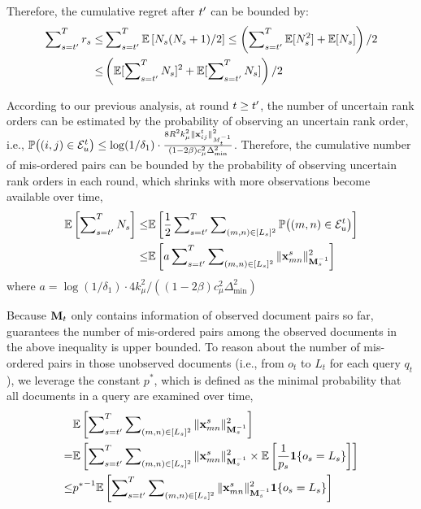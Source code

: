 Therefore, the cumulative regret after $t^\prime$ can be bounded by:
\small
 \begin{align*}
     \sum\nolimits_{s=t^\prime}^T r_s \leq & \sum\nolimits_{s=t^\prime}^T\mathbb{E}\left[{N_s(N_s+1)}/{2}\right] \nonumber \leq  \left(\sum\nolimits_{s=t^\prime}^T\mathbb{E}[N_s^2] + \mathbb{E}[N_s]\right)/2 \nonumber \\
    \leq &  \left(\mathbb{E}[\sum\nolimits_{s=t^\prime}^TN_s]^2 +\mathbb{E}[\sum\nolimits_{s=t^\prime}^TN_s]\right)/2
 \end{align*}
 \normalsize

According to our previous analysis, at round $t \geq t^\prime$, the number of uncertain rank orders can be estimated by the probability of observing an uncertain rank order, i.e., $\mathbb{P}\big((i, j) \in \mathcal{E}_u^t\big) \leq \log({1}/{\delta_1}) \cdot \frac{8R^2k_{\mu}^2\Vert{\mathbf{x}_{ij}^t}\Vert_{M_t^{-1}}^2}{(1 - 2\beta)c_{\mu}^2\Delta_{\min}^2}$. Therefore, the cumulative number of mis-ordered pairs can be bounded by the probability of observing uncertain rank orders in each round, which shrinks with more observations become available over time, 
\small
\begin{align*}
\label{eqn:up}
    \mathbb{E}\left[\sum\nolimits_{s=t^\prime}^T N_s\right] \leq &  \mathbb{E}\left[\frac{1}{2}\sum\nolimits_{s=t^\prime}^T \sum\nolimits_{(m, n) \in [L_s]^2} \mathbb{P}\big((m, n) \in \mathcal{E}_u^t\big)\right] \\
    \leq & \mathbb{E}\left[a\sum\nolimits_{s=t^\prime}^T\sum\nolimits_{(m, n) \in [L_s]^2} \Vert{\mathbf{x}_{mn}^s}\Vert_{\mathbf{M}_s^{-1}}^2\right]
\end{align*}
\normalsize
where $a = \log({1}/{\delta_1})\cdot{4k_{\mu}^2}/({(1 - 2\beta)c_{\mu}^2\Delta_{\min}^2})$

Because $\mathbf{M}_t$ only contains information of observed document pairs so far, \model{} guarantees the number of mis-ordered pairs among the observed documents in the above inequality is upper bounded. 
To reason about the number of mis-ordered pairs in those unobserved documents (i.e., from $o_t$ to $L_t$ for each query $q_t$), we leverage the constant $p^*$, which is defined as the minimal probability that all documents in a query are examined over time, 
\small
\begin{align*}
    &\mathbb{E}\left[\sum\nolimits_{s=t^\prime}^T\sum\nolimits_{(m, n) \in [L_s]^2} \Vert{\mathbf{x}_{mn}^s}\Vert_{\mathbf{M}_s^{-1}}^2\right] \\
    =& \mathbb{E}\left[\sum\nolimits_{s=t^\prime}^T\sum\nolimits_{(m, n) \in [L_s]^2} \Vert{\mathbf{x}_{mn}^s}\Vert_{\mathbf{M}_s^{-1}}^2\times \mathbb{E}\left[\frac{1}{p_{s}}\mathbf{1}\{o_s = L_s\}\right]\right] \\
    \leq& 
    {p^*}^{-1}\mathbb{E}\left[\sum\nolimits_{s=t^\prime}^T\sum\nolimits_{(m, n) \in [L_s]^2} \Vert{\mathbf{x}_{mn}^s}\Vert_{\mathbf{M}_s^{-1}}^2 \mathbf{1}\{o_s = L_s\}\right] 
\end{align*}
\normalsize

